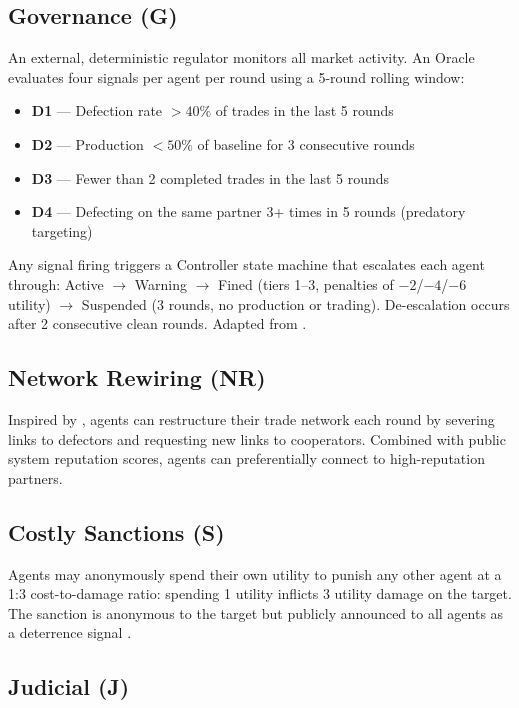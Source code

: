 \documentclass{article}
\begin{document}
\subsection{Governance (G)}

An external, deterministic regulator monitors all market activity. An Oracle evaluates four signals per agent per round using a 5-round rolling window:

\begin{itemize}
  \item \textbf{D1} --- Defection rate $>40\%$ of trades in the last 5 rounds
  \item \textbf{D2} --- Production $<50\%$ of baseline for 3 consecutive rounds
  \item \textbf{D3} --- Fewer than 2 completed trades in the last 5 rounds
  \item \textbf{D4} --- Defecting on the same partner 3+ times in 5 rounds (predatory targeting)
\end{itemize}

Any signal firing triggers a Controller state machine that escalates each agent through: Active $\to$ Warning $\to$ Fined (tiers 1--3, penalties of $-2$/$-4$/$-6$ utility) $\to$ Suspended (3 rounds, no production or trading). De-escalation occurs after 2 consecutive clean rounds. Adapted from \citet{institutional2025}.

\subsection{Network Rewiring (NR)}

Inspired by \citet{repunet}, agents can restructure their trade network each round by severing links to defectors and requesting new links to cooperators. Combined with public system reputation scores, agents can preferentially connect to high-reputation partners.

\subsection{Costly Sanctions (S)}

Agents may anonymously spend their own utility to punish any other agent at a 1:3 cost-to-damage ratio: spending 1 utility inflicts 3 utility damage on the target. The sanction is anonymous to the target but publicly announced to all agents as a deterrence signal \citep{piedrahita2025}.

\subsection{Judicial (J)}
\end{document}
